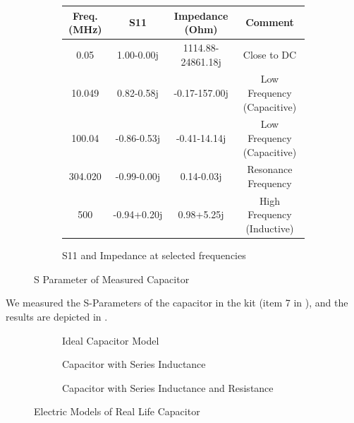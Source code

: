 \documentclass{article}
\begin{document}
\begin{figure}[h]
    \begin{subfigure}{\linewidth}
        \centering
        \begin{tabular}{ |c|c|c|c| }
            \hline
            Freq. (MHz) & S11         & Impedance (Ohm)   & Comment
            \\\hline
            0.05        & 1.00-0.00j  & 1114.88-24861.18j & Close to DC
            \\\hline
            10.049      & 0.82-0.58j  & -0.17-157.00j     & Low Frequency (Capacitive)
            \\\hline
            100.04      & -0.86-0.53j & -0.41-14.14j      & Low Frequency (Capacitive)
            \\\hline
            304.020     & -0.99-0.00j & 0.14-0.03j        & Resonance Frequency
            \\\hline
            500         & -0.94+0.20j & 0.98+5.25j        & High Frequency (Inductive)
            \\\hline
        \end{tabular}
        \caption{S11 and Impedance at selected frequencies}
        \label{tab:capacitor_meas}
    \end{subfigure}

    \caption{S Parameter of Measured Capacitor}
    \label{fig:capacitor_meas}
\end{figure}

We measured the S-Parameters of the capacitor in the kit (item 7 in ), and the results are depicted in .

\begin{figure}
    \centering
    \begin{subfigure}{.5\linewidth}
        \centering
        \caption{Ideal Capacitor Model}
        \label{fig:capacitor_c}
    \end{subfigure}%
    \begin{subfigure}{.5\linewidth}
        \centering
        \caption{Capacitor with Series Inductance}
        \label{fig:capacitor_cl}
    \end{subfigure}%

    \begin{subfigure}{.5\linewidth}
        \centering
        \caption{Capacitor with Series Inductance and Resistance}
        \label{fig:capacitor_clr}
    \end{subfigure}%
    \caption{Electric Models of Real Life Capacitor}
\end{figure}
\end{document}
